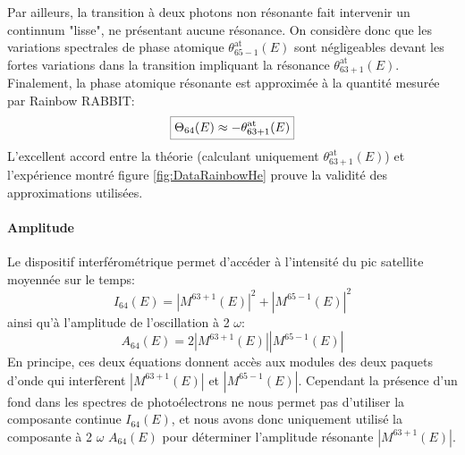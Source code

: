 Par ailleurs, la transition à deux photons non résonante fait intervenir un continnum "lisse", ne présentant aucune résonance. On considère donc que les variations spectrales de phase atomique $\theta^{\text{at}}_{65-1}(E)$ sont négligeables devant les fortes variations dans la transition impliquant la résonance $\theta^{\text{at}}_{63+1}(E)$. Finalement, la phase atomique résonante est approximée à la quantité mesurée par Rainbow RABBIT:
\begin{equation}
\setlength\fboxrule{0.25pt}
\boxed{
\Theta_{64} (E) \approx - \theta^{\text{at}}_{63+1}(E)
}
\end{equation}
L'excellent accord entre la théorie (calculant uniquement $\theta^{\text{at}}_{63+1}(E)$) et l'expérience montré figure \ref{fig:DataRainbowHe} prouve la validité des approximations utilisées.

\paragraph*{Amplitude} Le dispositif interférométrique permet d'accéder à l'intensité du pic satellite moyennée sur le temps: 
\begin{equation}
I_{64}(E) = \left| M^{63+1}(E)\right|^2 + \left| M^{65-1}(E)\right|^2
\label{eq:I}
\end{equation}
ainsi qu'à l'amplitude de l'oscillation à 2 $\omega$:
\begin{equation}
A_{64}(E) = 2 \left| M^{63+1}(E)\right| \left| M^{65-1}(E)\right|
\label{eq:A}
\end{equation}
En principe, ces deux équations donnent accès aux modules des deux paquets d'onde qui interfèrent $\left| M^{63+1}(E)\right|$ et $\left| M^{65-1}(E)\right|$. Cependant la présence d'un fond dans les spectres de photoélectrons ne nous permet pas d'utiliser la composante continue $I_{64}(E)$, et nous avons donc uniquement utilisé la composante à 2 $\omega$ $A_{64}(E)$ pour déterminer l'amplitude résonante $\left| M^{63+1}(E)\right|$.

